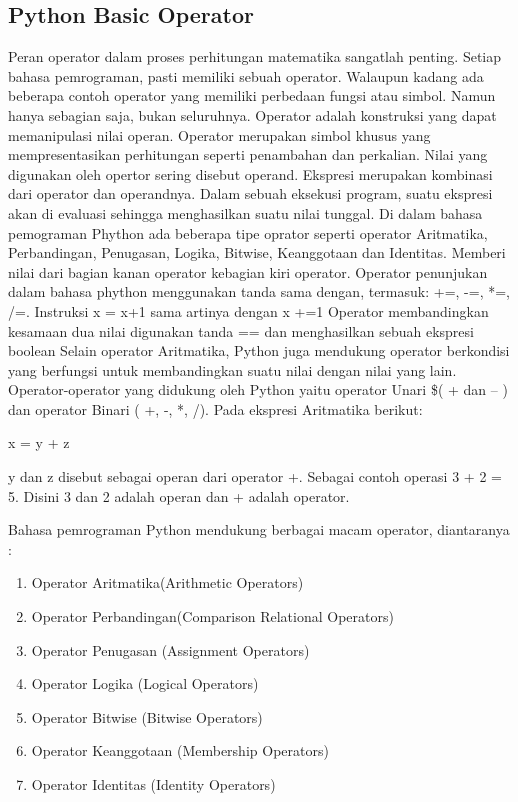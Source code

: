 \subsection{Python Basic Operator}
Peran operator dalam proses perhitungan matematika sangatlah penting.
Setiap bahasa pemrograman, pasti memiliki sebuah operator. Walaupun kadang ada beberapa contoh operator yang memiliki perbedaan fungsi atau simbol. Namun hanya sebagian saja, bukan seluruhnya. Operator adalah konstruksi yang dapat memanipulasi nilai operan.
Operator merupakan simbol khusus yang mempresentasikan perhitungan seperti penambahan dan perkalian. Nilai yang digunakan oleh opertor sering disebut operand. Ekspresi merupakan kombinasi dari operator dan operandnya. Dalam sebuah eksekusi program, suatu ekspresi akan di evaluasi sehingga menghasilkan suatu nilai tunggal. Di dalam bahasa pemograman Phython ada beberapa tipe oprator seperti operator Aritmatika, Perbandingan, Penugasan, Logika, Bitwise, Keanggotaan dan Identitas.
Memberi nilai dari bagian kanan operator kebagian kiri operator. Operator penunjukan dalam bahasa phython menggunakan tanda sama dengan, termasuk:
+=, -=, *=, /=. 
Instruksi x = x+1 sama artinya dengan x +=1
Operator membandingkan kesamaan dua nilai digunakan tanda == dan menghasilkan sebuah ekspresi boolean 
Selain operator Aritmatika, Python juga mendukung operator berkondisi yang berfungsi untuk membandingkan suatu nilai dengan nilai yang lain. Operator-operator yang didukung oleh Python yaitu operator Unari \$( + dan – ) dan operator Binari ( +, -, *, /). Pada ekspresi Aritmatika berikut:

x = y + z
 
y dan z disebut sebagai operan dari operator +.  
Sebagai contoh operasi 3 + 2 = 5. Disini 3 dan 2 adalah operan dan + adalah operator.

Bahasa pemrograman Python mendukung berbagai macam operator, diantaranya :
\begin{enumerate}
	\item Operator Aritmatika(Arithmetic Operators)
	\item Operator Perbandingan(Comparison Relational Operators)
	\item Operator Penugasan (Assignment Operators)
	\item Operator Logika (Logical Operators)
	\item Operator Bitwise (Bitwise Operators)
	\item Operator Keanggotaan (Membership Operators)
	\item Operator Identitas (Identity Operators)
\end{enumerate}  


